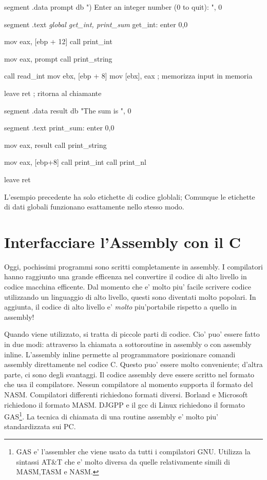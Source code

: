\begin{AsmCodeListing}[label=sub4.asm,commandchars=\\\{\}]

segment .data
prompt  db      ") Enter an integer number (0 to quit): ", 0

segment .text
\textit{        global  get_int, print_sum}
get_int:
        enter   0,0

        mov     eax, [ebp + 12]
        call    print_int

        mov     eax, prompt
        call    print_string
        
        call    read_int
        mov     ebx, [ebp + 8]
        mov     [ebx], eax         ; memorizza input in memoria

        leave
        ret                        ; ritorna al chiamante

segment .data
result  db      "The sum is ", 0

segment .text
print_sum:
        enter   0,0

        mov     eax, result
        call    print_string

        mov     eax, [ebp+8]
        call    print_int
        call    print_nl

        leave
        ret
\end{AsmCodeListing}

L'esempio precedente ha solo etichette di codice globlali;
Comunque le etichette di dati globali funzionano esattamente
nello stesso modo.

\section{Interfacciare l'Assembly con il C}

Oggi, pochissimi programmi sono scritti completamente in assembly. I compilatori
hanno raggiunto una grande efficenza nel convertire il codice di alto livello
in codice macchina efficente. Dal momento che e' molto piu' facile scrivere
codice utilizzando un linguaggio di alto livello, questi sono diventati molto
popolari. In aggiunta, il codice di alto livello e' \emph{molto} piu'portabile
rispetto a quello in assembly!

Quando viene utilizzato, si tratta di piccole parti di codice. Cio' puo' essere
fatto in due modi: attraverso la chiamata a sottoroutine in assembly o con 
assembly inline. L'assembly inline permette al programmatore posizionare
comandi assembly direttamente nel codice C. Questo puo' essere molto
conveniente; d'altra parte, ci sono degli svantaggi. Il codice assembly 
deve essere scritto nel formato che usa il compilatore. Nessun compilatore
al momento supporta il formato del NASM. Compilatori differenti richiedono
formati diversi. Borland e Microsoft richiedono il formato MASM. DJGPP e
il gcc di Linux richiedono il formato GAS\footnote{GAS e' l'assembler che viene usato
da tutti i compilatori GNU. Utilizza la sintassi AT\&T che e' molto diversa
da quelle relativamente simili di MASM,TASM e NASM.}. La tecnica di chiamata
di una routine assembly e' molto piu' standardizzata sui PC.


